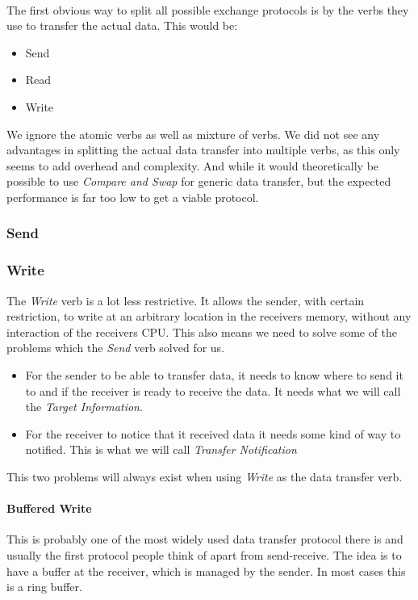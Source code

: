 \paragraph{} The first obvious way to split all possible exchange protocols is by the verbs they use to transfer the actual data. 
This would be:
\begin{itemize}
  \item Send
  \item Read
  \item Write
\end{itemize}
We ignore the atomic verbs as well as mixture of verbs. We did not see any advantages in splitting the actual data transfer 
into multiple verbs, as this only seems to add overhead and complexity. And while it would theoretically be possible to use
\emph{Compare and Swap} for generic data transfer, but the expected performance is far too low to get a viable protocol.


\subsubsection{Send}

\subsubsection{Write}
The \emph{Write} verb is a lot less restrictive. It allows the sender, with certain restriction, to write at an arbitrary 
location in the receivers memory, without any interaction of the receivers CPU. This also means we need to solve some of the 
problems which the \emph{Send} verb solved for us.

\begin{itemize}
  \item For the sender to be able to transfer data, it needs to know where to send it to and if the receiver is ready 
to receive the data. It needs what we will call the \emph{Target Information}.

  \item For the receiver to notice that it received data it needs some kind of way to notified. This is what we will
call \emph{Transfer Notification}
\end{itemize}

This two problems will always exist when using \emph{Write} as the data transfer verb. 

\paragraph{Buffered Write}
This is probably one of the most widely used data transfer protocol there is and usually the first protocol people think of
apart from send-receive. The idea is to have a buffer at the receiver, which is managed by the sender. In most cases this is 
a ring buffer. 

